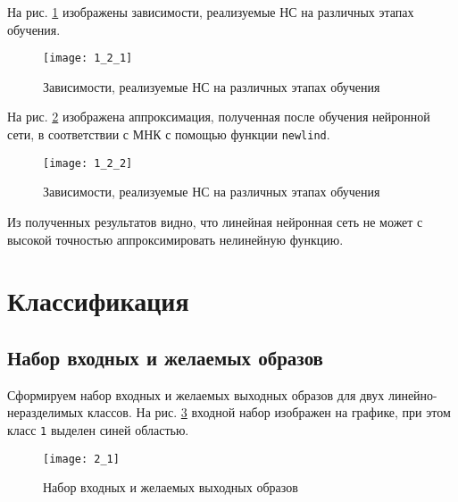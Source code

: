 На рис. \ref{fig:1_2_1} изображены зависимости, реализуемые НС на различных этапах обучения.
\begin{figure}[H]
\begin{center}
	\texttt{[image: 1\_2\_1]}
	\caption{Зависимости, реализуемые НС на различных этапах обучения}
	\label{fig:1_2_1}
\end{center}
\end{figure}

\newpage

На рис. \ref{fig:1_2_2} изображена аппроксимация, полученная после обучения нейронной сети, в соответствии с МНК с помощью функции \verb+newlind+.
\begin{figure}[H]
\begin{center}
	\texttt{[image: 1\_2\_2]}
	\caption{Зависимости, реализуемые НС на различных этапах обучения}
	\label{fig:1_2_2}
\end{center}
\end{figure}

Из полученных результатов видно, что линейная нейронная сеть не может с высокой точностью аппроксимировать нелинейную функцию.

\newpage

\section{Классификация}


\subsection{Набор входных и желаемых образов}

Сформируем набор входных и желаемых выходных образов для двух линейно-неразделимых классов. На рис. \ref{fig:2_1} входной набор изображен на графике, при этом класс \verb+1+ выделен синей областью.

\begin{figure}[H]
\begin{center}
	\texttt{[image: 2\_1]}
	\caption{Набор входных и желаемых выходных образов}
	\label{fig:2_1}
\end{center}
\end{figure}

